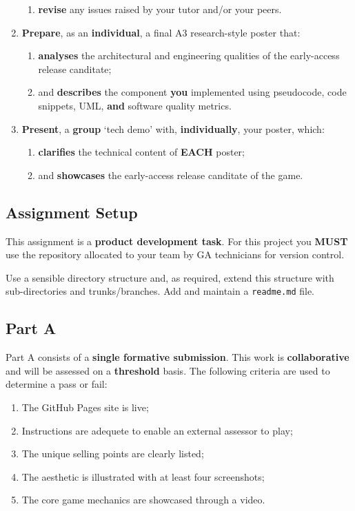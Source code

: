 \documentclass{../../fal_assignment}
\begin{document}
\begin{enumerate}[label=(\Alph*)]
\begin{enumerate}[label=\roman*.]
    		\item \textbf{revise} any issues raised by your tutor and/or your peers.
	\end{enumerate}
    \item \textbf{Prepare}, as an \textbf{individual}, a final A3 research-style poster that:
    	\begin{enumerate}[label=\roman*.]
    		\item \textbf{analyses} the architectural and engineering qualities of the early-access release canditate;
    		\item and \textbf{describes} the component \textbf{you} implemented using pseudocode, code snippets, UML, \textbf{and} software quality metrics. 
	\end{enumerate}
    \item \textbf{Present}, a \textbf{group} `tech demo' with, \textbf{individually}, your poster, which:
    	\begin{enumerate}[label=\roman*.]
    		\item \textbf{clarifies} the technical content of \textbf{EACH} poster;
    		\item and \textbf{showcases} the early-access release canditate of the game.
	\end{enumerate}
\end{enumerate}
  
\subsection*{Assignment Setup}

This assignment is a \textbf{product development task}. For this project you \textbf{MUST} use the repository allocated to your team by GA technicians for version control.

Use a sensible directory structure and, as required, extend this structure with sub-directories and trunks/branches. Add and maintain a \texttt{readme.md} file. 

\subsection*{Part A}

Part A consists of a \textbf{single formative submission}. This work is \textbf{collaborative} and will be assessed on a \textbf{threshold} basis. The following criteria are used to determine a pass or fail:

\begin{enumerate}[label=(\alph*)]
	\item The GitHub Pages site is live;
	\item Instructions are adequete to enable an external assessor to play;
	\item The unique selling points are clearly listed;
	\item The aesthetic is illustrated with at least four screenshots;
	\item The core game mechanics are showcased through a video.
\end{enumerate}
\end{document}
